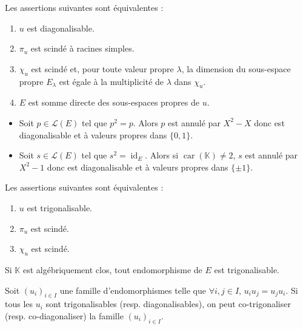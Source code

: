 
  \begin{theorem}
    Les assertions suivantes sont équivalentes :
    \begin{enumerate}[label=(\roman*)]
      \item $u$ est diagonalisable.
      \item $\pi_u$ est scindé à racines simples.
      \item $\chi_u$ est scindé et, pour toute valeur propre $\lambda$, la dimension du sous-espace propre $E_\lambda$ est égale à la multiplicité de $\lambda$ dans $\chi_u$.
      \item $E$ est somme directe des sous-espaces propres de $u$.
    \end{enumerate}
  \end{theorem}

  \begin{example}
    \begin{itemize}
      \item Soit $p \in \mathcal{L}(E)$ tel que $p^2 = p$. Alors $p$ est annulé par $X^2 - X$ donc est diagonalisable et à valeurs propres dans $\{ 0, 1 \}$.
      \item Soit $s \in \mathcal{L}(E)$ tel que $s^2 = \operatorname{id}_E$. Alors si $\operatorname{car}(\mathbb{K}) \neq 2$, $s$ est annulé par $X^2 - 1$ donc est diagonalisable et à valeurs propres dans $\{ \pm 1 \}$.
    \end{itemize}
  \end{example}

  \begin{theorem}
    Les assertions suivantes sont équivalentes :
    \begin{enumerate}[label=(\roman*)]
      \item $u$ est trigonalisable.
      \item $\pi_u$ est scindé.
      \item $\chi_u$ est scindé.
    \end{enumerate}
  \end{theorem}

  \begin{example}
    Si $\mathbb{K}$ est algébriquement clos, tout endomorphisme de $E$ est trigonalisable.
  \end{example}


  \begin{theorem}
    \label{151-1}
    Soit $(u_i)_{i \in I}$ une famille d'endomorphismes telle que $\forall i, j \in I, \, u_i u_j = u_j u_i$. Si tous les $u_i$ sont trigonalisables (resp. diagonalisables), on peut co-trigonaliser (resp. co-diagonaliser) la famille $(u_i)_{i \in I}$.
  \end{theorem}

